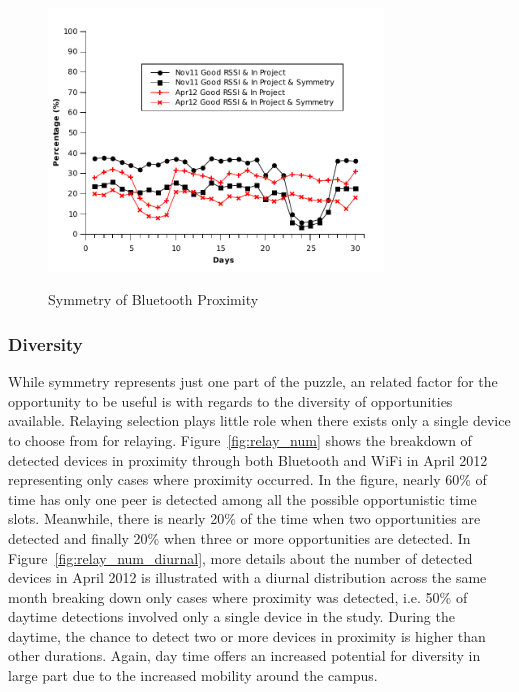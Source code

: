 \begin{figure}[tbp]
\centering 
{\includegraphics[width=3.5in]{graphs/daily_symmetric.pdf}}
\caption{Symmetry of Bluetooth Proximity} 
\label{fig:daily_symmetric}
\end{figure} 


\subsubsection*{Diversity}
While symmetry represents just one part of the puzzle, an related factor for the opportunity to be useful is with regards to the diversity of opportunities available.  Relaying selection plays little role when there exists only a single device to choose from for relaying.   Figure~\ref{fig:relay_num} shows the breakdown of detected devices in proximity through both Bluetooth and WiFi in April 2012 representing only cases where proximity occurred. In the figure, nearly 60\% of time has only one peer is detected among all the possible opportunistic time slots. Meanwhile, there is nearly 20\% of the time when two opportunities are detected and finally 20\% when three or more opportunities are detected. In Figure~\ref{fig:relay_num_diurnal}, more details about the number of detected devices in April 2012 is illustrated with a diurnal distribution across the same month breaking down only cases where proximity was detected, i.e. 50\% of daytime detections involved only a single device in the study. During the daytime, the chance to detect two or more devices in proximity is higher than other durations. Again, day time offers an increased potential for diversity in large part due to the increased mobility around the campus.  

